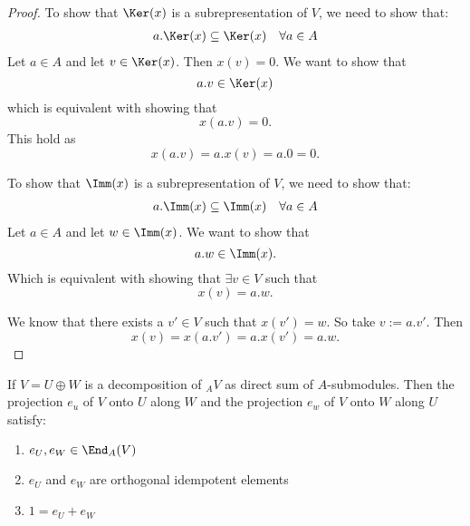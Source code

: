 \begin{proof}
To show that \(\Ker(x)\) is a subrepresentation of \(V\), we need to show that:
\begin{align*}
a.\Ker(x)\subseteq \Ker(x) &&\forall a\in A
\end{align*}
Let \(a\in A\) and let \(v\in \Ker(x)\). Then \(x(v)=0\). We want to show that
\[
a.v\in \Ker(x)
\]
which is equivalent with showing that
\[
x(a.v)=0.
\]
This hold as
\[
x(a.v)=a.x(v)=a.0=0.
\]

To show that \(\Imm(x)\) is a subrepresentation of \(V\), we need to show that:
\begin{align*}
a.\Imm(x)\subseteq \Imm(x) &&\forall a\in A
\end{align*}
Let \(a\in A\) and let \(w\in \Imm(x)\). We want to show that
\[
a.w\in \Imm(x).
\]
Which is equivalent with showing that \(\exists v\in V\) such that
\[
x(v)=a.w.
\]

We know that there exists a \(v'\in V\) such that \(x(v')=w\). So take \(v:=a.v'\). Then
\[
x(v)=x(a.v')=a.x(v')=a.w.
\]
\end{proof}
\newpage
\begin{prop}
If \(V=U\oplus W\) is a decomposition of \(_AV\) as direct sum of \(A\)-submodules. Then the projection \(e_{u}\) of \(V\) onto \(U\) along \(W\) and the projection \(e_{w}\) of \(V\) onto \(W\) along \(U\) satisfy:

\begin{enumerate}
  \item \(e_U,e_W \in \End_A(V)\)
  \item \(e_U\) and \(e_W\) are orthogonal idempotent elements
  \item \(1=e_U+e_W\)

\end{enumerate}
\end{prop}
